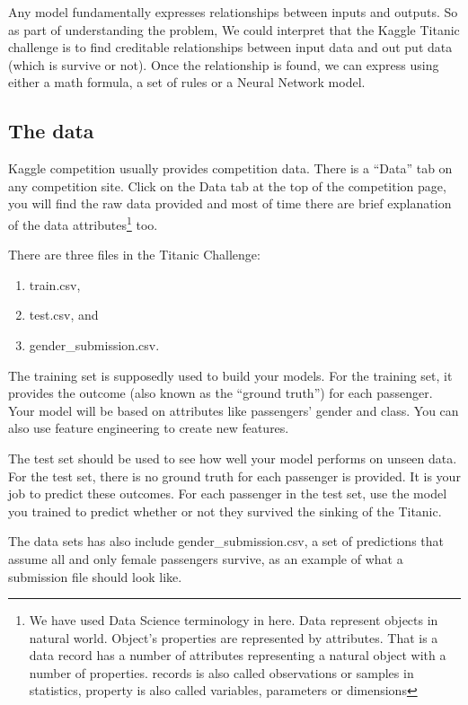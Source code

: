 \documentclass[
]{book}
\providecommand{\tightlist}{%
  \setlength{\itemsep}{0pt}\setlength{\parskip}{0pt}}
\begin{document}
Any model fundamentally expresses relationships between inputs and outputs. So as part of understanding the problem, We could interpret that the Kaggle Titanic challenge is to find creditable relationships between input data and out put data (which is survive or not). Once the relationship is found, we can express using either a math formula, a set of rules or a Neural Network model.

\hypertarget{the-data}{%
\subsection*{The data}\label{the-data}}


Kaggle competition usually provides competition data. There is a ``Data'' tab on any competition site. Click on the Data tab at the top of the competition page, you will find the raw data provided and most of time there are brief explanation of the data attributes\footnote{We have used Data Science terminology in here. Data represent objects in natural world. Object's properties are represented by attributes. That is a data record has a number of attributes representing a natural object with a number of properties. records is also called observations or samples in statistics, property is also called variables, parameters or dimensions} too.

There are three files in the Titanic Challenge:

\begin{enumerate}
\def\labelenumi{(\arabic{enumi})}
\tightlist
\item
  train.csv,
\item
  test.csv, and
\item
  gender\_submission.csv.
\end{enumerate}

The training set is supposedly used to build your models. For the training set, it provides the outcome (also known as the ``ground truth'') for each passenger. Your model will be based on attributes like passengers' gender and class. You can also use feature engineering to create new features.

The test set should be used to see how well your model performs on unseen data. For the test set, there is no ground truth for each passenger is provided. It is your job to predict these outcomes. For each passenger in the test set, use the model you trained to predict whether or not they survived the sinking of the Titanic.

The data sets has also include gender\_submission.csv, a set of predictions that assume all and only female passengers survive, as an example of what a submission file should look like.
\end{document}
